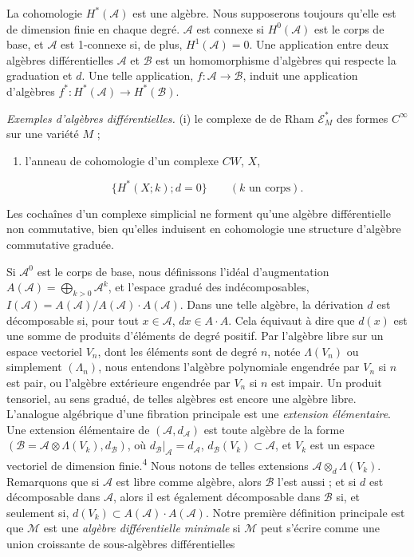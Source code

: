 \documentclass[
  french,
  a3paper,
  a3paper]{extarticle}
\providecommand{\tightlist}{%
  \setlength{\itemsep}{0pt}\setlength{\parskip}{0pt}}
\begin{document}
La cohomologie \(H^*(\mathscr A)\) est une algèbre. Nous supposerons
toujours qu'elle est de dimension finie en chaque degré. \(\mathscr A\)
est connexe si \(H^0(\mathscr A)\) est le corps de base, et
\(\mathscr A\) est 1-connexe si, de plus, \(H^1(\mathscr A)=0\). Une
application entre deux algèbres différentielles \(\mathscr A\) et
\(\mathscr B\) est un homomorphisme d'algèbres qui respecte la
graduation et \(d\). Une telle application,
\(f:\mathscr A\to\mathscr B\), induit une application d'algèbres
\(f^*:H^*(\mathscr A)\to H^*(\mathscr B)\).

\emph{Exemples d'algèbres différentielles.} (i) le complexe de de Rham
\(\mathscr E_M^*\) des formes \(C^\infty\) sur une variété \(M\) ;

\begin{enumerate}
\def\labelenumi{(\roman{enumi})}
\setcounter{enumi}{1}
\tightlist
\item
  l'anneau de cohomologie d'un complexe \(CW\), \(X\),
\end{enumerate}

\[
\{H^*(X;k);d=0\}\qquad(k\text{ un corps}).
\]

Les cochaînes d'un complexe simplicial ne forment qu'une algèbre
différentielle non commutative, bien qu'elles induisent en cohomologie
une structure d'algèbre commutative graduée.

Si \(\mathscr A^0\) est le corps de base, nous définissons l'idéal
d'augmentation \(A(\mathscr A)=\bigoplus_{k>0}\mathscr A^k\), et
l'espace gradué des indécomposables,
\(I(\mathscr A)=A(\mathscr A)/A(\mathscr A)\cdot A(\mathscr A)\). Dans
une telle algèbre, la dérivation \(d\) est décomposable si, pour tout
\(x\in\mathscr A\), \(dx\in A\cdot A\). Cela équivaut à dire que
\(d(x)\) est une somme de produits d'éléments de degré positif. Par
l'algèbre libre sur un espace vectoriel \(V_n\), dont les éléments sont
de degré \(n\), notée \(\Lambda(V_n)\) ou simplement \((\Lambda_n)\),
nous entendons l'algèbre polynomiale engendrée par \(V_n\) si \(n\) est
pair, ou l'algèbre extérieure engendrée par \(V_n\) si \(n\) est impair.
Un produit tensoriel, au sens gradué, de telles algèbres est encore une
algèbre libre. L'analogue algébrique d'une fibration principale est une
\emph{extension élémentaire}. Une extension élémentaire de
\((\mathscr A,d_{\mathscr A})\) est toute algèbre de la forme
\((\mathscr B=\mathscr A\otimes\Lambda(V_k),d_{\mathscr B})\), où
\(d_{\mathscr B}|_{\mathscr A}=d_{\mathscr A}\),
\(d_{\mathscr B}(V_k)\subset\mathscr A\), et \(V_k\) est un espace
vectoriel de dimension finie.\textsuperscript{4} Nous notons de telles
extensions \(\mathscr A\otimes_d\Lambda(V_k)\). Remarquons que si
\(\mathscr A\) est libre comme algèbre, alors \(\mathscr B\) l'est aussi
; et si \(d\) est décomposable dans \(\mathscr A\), alors il est
également décomposable dans \(\mathscr B\) si, et seulement si,
\(d(V_k)\subset A(\mathscr A)\cdot A(\mathscr A)\). Notre première
définition principale est que \(\mathcal M\) est une \emph{algèbre
différentielle minimale} si \(\mathcal M\) peut s'écrire comme une union
croissante de sous-algèbres différentielles
\end{document}
